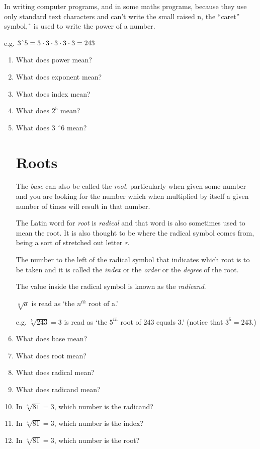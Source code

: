 \documentclass{article}
\begin{document}
In writing computer programs, and in some maths programs, because they use only standard text characters and can’t write the small raised n, the “caret” symbol, \^\, is used to write the power of a number.

e.g.	$3 \string^ 5 = 3 \cdot 3 \cdot 3 \cdot 3 \cdot 3 = 243$

\begin{enumerate}

\item What does power mean?
\item What does exponent mean?
\item What does index mean?
\item What does $2^5$ mean?
\item What does 3 \^\ 6 mean?

\section*{Roots}

The \textit{base} can also be called the \textit{root}, particularly when given some number and you are looking for the number which when multiplied by itself a given number of times will result in that number.

The Latin word for \textit{root} is \textit{radical} and that word is also sometimes used to mean the root. It is also thought to be where the radical symbol \textsurd \enspace comes from, being a sort of stretched out letter \textit{r}.

The number to the left of the radical symbol that indicates which root is to be taken and it is called the \textit{index} or the \textit{order} or the \textit{degree} of the root.

The value inside the radical symbol is known as the \textit{radicand}.

$\sqrt[n]{a}$ is read as ‘the $n^{th}$ root of a.’

e.g.	$\sqrt[5]{243}=3$ is read as ‘the $5^{th}$ root of 243 equals 3.’ (notice that $3^5 = 243$.)

\vspace{16pt}
\item What does base mean?
\item What does root mean?
\item What does radical mean?
\item What does radicand mean?
\item In $\sqrt[4]{81}=3$, which number is the radicand?
\item In $\sqrt[4]{81}=3$, which number is the index?
\item In $\sqrt[4]{81}=3$, which number is the root?


\end{enumerate}
\end{document}
